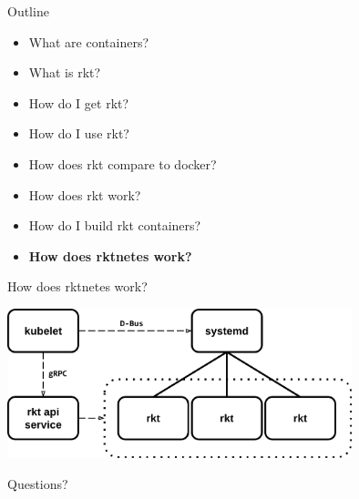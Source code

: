\documentclass[pdf,aspectratio=169]{beamer}
\begin{document}
\begin{frame}
    Outline
    \begin{itemize}
        \item What are containers?
        \item What is rkt?
        \item How do I get rkt?
        \item How do I use rkt?
        \item How does rkt compare to docker?
        \item How does rkt work?
        \item How do I build rkt containers?
        \item \textbf{How does rktnetes work?}
    \end{itemize}
\end{frame}

\begin{frame}{How does rktnetes work?}
    \begin{center}
        \includegraphics[width=0.75\textwidth]{rktnetes-model}
    \end{center}
\end{frame}

\begin{frame}
    \center \LARGE Questions? \normalsize
\end{frame}
\end{document}
